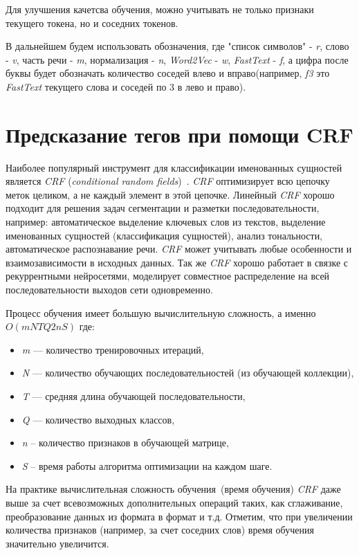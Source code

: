 \documentclass{csmathnotes}
\begin{document}
Для улучшения качетсва обучения, можно учитывать не только признаки текущего токена, но и соседних токенов.

В дальнейшем будем использовать обозначения, где "список символов" - \emph{r}, слово - \emph{v}, часть речи - \emph{m}, нормализация - \emph{n}, \emph{Word2Vec} - \emph{w}, \emph{FastText} - \emph{f}, а цифра после буквы будет обозначать количество соседей влево и вправо(например, \emph{f3} это \emph{FastText} текущего слова и соседей по $3$ в лево и право).

\section*{Предсказание тегов при помощи CRF}
Наиболее  популярный инструмент для классификации именованных сущностей является \emph{CRF} (\emph{conditional random fields})~\cite{HabrCRF}. \emph{CRF} оптимизирует всю цепочку меток целиком, а не каждый элемент в этой цепочке.  Линейный \emph{CRF} хорошо подходит для решения задач сегментации и разметки последовательности, например: автоматическое выделение ключевых слов из текстов, выделение именованных сущностей (классификация сущностей), анализ тональности, автоматическое распознавание речи. \emph{CRF} может учитывать любые особенности и взаимозависимости в исходных данных. Так же \emph{CRF} хорошо работает в связке с рекуррентными нейросетями, моделирует совместное распределение на всей последовательности выходов сети одновременно.


Процесс обучения имеет большую вычислительную сложность, а именно $O(mNTQ2nS)$ где:
\begin{itemize}
    \item \emph{m} — количество тренировочных итераций,
    \item \emph{N} — количество обучающих последовательностей (из обучающей коллекции),
    \item \emph{T} — средняя длина обучающей последовательности,
    \item \emph{Q} — количество выходных классов,
    \item \emph{n} – количество признаков в обучающей матрице,
    \item \emph{S} – время работы алгоритма оптимизации на каждом шаге. 
\end{itemize}


На практике вычислительная сложность обучения~(время обучения) \emph{CRF} даже выше за счет всевозможных дополнительных операций таких, как сглаживание, преобразование данных из формата в формат и т.д. Отметим, что при увеличении количества признаков (например, за счет соседних слов) время обучения значительно увеличится. 
\end{document}

